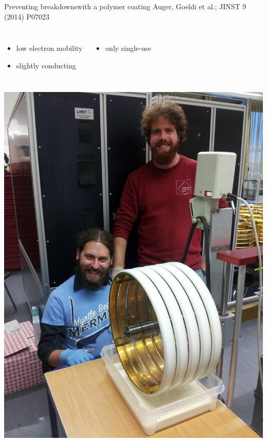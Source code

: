 \documentclass[]{beamer}
\newcommand*{\emphcol}{red}
\begin{document}
\begin{frame}{Preventing breakdowns}{with a polymer coating}
	{\tiny Auger, Goeldi et al.; JINST 9 (2014) P07023~\cite{latex}}
	\begin{columns}[c]
		\begin{itemize}
			\item low electron mobility
			\item slightly conducting
		\end{itemize}
		\begin{itemize}
			\item {\color{\emphcol} only single-use}
		\end{itemize}
	\end{columns}
	\begin{columns}[c]
		\centering
		\includegraphics[width=\textwidth]{defence/coating}
		\centering

\end{columns}
\end{frame}
\end{document}
